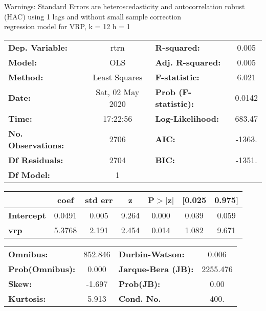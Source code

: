 Warnings: \newline
 [1] Standard Errors are heteroscedasticity and autocorrelation robust (HAC) using 1 lags and without small sample correction\\ 

regression model for VRP, k = 12 h = 1\begin{center}
\begin{tabular}{lclc}
\toprule
\textbf{Dep. Variable:}    &       rtrn       & \textbf{  R-squared:         } &     0.005   \\
\textbf{Model:}            &       OLS        & \textbf{  Adj. R-squared:    } &     0.005   \\
\textbf{Method:}           &  Least Squares   & \textbf{  F-statistic:       } &     6.021   \\
\textbf{Date:}             & Sat, 02 May 2020 & \textbf{  Prob (F-statistic):} &   0.0142    \\
\textbf{Time:}             &     17:22:56     & \textbf{  Log-Likelihood:    } &    683.47   \\
\textbf{No. Observations:} &        2706      & \textbf{  AIC:               } &    -1363.   \\
\textbf{Df Residuals:}     &        2704      & \textbf{  BIC:               } &    -1351.   \\
\textbf{Df Model:}         &           1      & \textbf{                     } &             \\
\bottomrule
\end{tabular}
\begin{tabular}{lcccccc}
                   & \textbf{coef} & \textbf{std err} & \textbf{z} & \textbf{P$> |$z$|$} & \textbf{[0.025} & \textbf{0.975]}  \\
\midrule
\textbf{Intercept} &       0.0491  &        0.005     &     9.264  &         0.000        &        0.039    &        0.059     \\
\textbf{vrp}       &       5.3768  &        2.191     &     2.454  &         0.014        &        1.082    &        9.671     \\
\bottomrule
\end{tabular}
\begin{tabular}{lclc}
\textbf{Omnibus:}       & 852.846 & \textbf{  Durbin-Watson:     } &    0.006  \\
\textbf{Prob(Omnibus):} &   0.000 & \textbf{  Jarque-Bera (JB):  } & 2255.476  \\
\textbf{Skew:}          &  -1.697 & \textbf{  Prob(JB):          } &     0.00  \\
\textbf{Kurtosis:}      &   5.913 & \textbf{  Cond. No.          } &     400.  \\
\bottomrule
\end{tabular}
\end{center}

